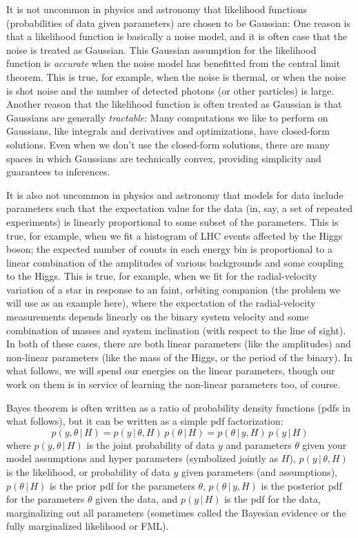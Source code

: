 \documentclass[12pt, letterpaper]{article}
\newcommand{\acronym}[1]{\small{#1}}
\newcommand{\FML}{\acronym{FML}}
\newcommand{\given}{\,|\,}
\begin{document}
It is not uncommon in physics and astronomy that likelihood functions
(probabilities of data given parameters) are chosen to be Gaussian:
One reason is that a likelihood function is basically a noise model,
and it is often case that the noise is treated as Gaussian.
This Gaussian assumption for the likelihood function is
\emph{accurate} when the noise model has benefitted from the central
limit theorem.
This is true, for example, when the noise is thermal, or when the
noise is shot noise and the number of detected photons (or other
particles) is large.
Another reason that the likelihood function is often treated as
Gaussian is that Gaussians are generally \emph{tractable}:
Many computations we like to perform on Gaussians, like integrals and
derivatives and optimizations, have closed-form solutions.
Even when we don't use the closed-form solutions, there are many
spaces in which Gaussians are technically convex, providing simplicity
and guarantees to inferences.

It is also not uncommon in physics and astronomy that models for data
include parameters such that the expectation value for the data (in,
say, a set of repeated experiments) is linearly proportional to some
subset of the parameters.
This is true, for example, when we fit a histogram of LHC events
affected by the Higgs boson; the expected number of counts in each
energy bin is proportional to a linear combination of the amplitudes
of various backgrounds and some coupling to the Higgs.
This is true, for example, when we fit for the radial-velocity
variation of a star in response to an faint, orbiting companion (the
problem we will use as an example here), where the expectation of the
radial-velocity measurements depends linearly on the binary system
velocity and some combination of masses and system inclination (with
respect to the line of sight).
In both of these cases, there are both linear parameters (like the
amplitudes) and non-linear parameters (like the mass of the Higgs, or
the period of the binary).
In what follows, we will spend our energies on the linear parameters,
though our work on them is in service of learning the non-linear
parameters too, of course.

Bayes theorem is often written as a ratio of probability density
functions (pdfs in what follows), but it can be written as a simple
pdf factorization:
\begin{equation}
p(y,\theta\given H) = p(y\given\theta,H)\,p(\theta\given H) = p(\theta\given y,H)\,p(y\given H)
\end{equation}
where
$p(y,\theta\given H)$ is the joint probability of data $y$ and
parameters $\theta$ given your model assumptions and hyper parameters
(symbolized jointly as $H$),
$p(y\given\theta,H)$ is the likelihood, or probability of data $y$
given parameters (and assumptions),
$p(\theta\given H)$ is the prior pdf for the parameters $\theta$,
$p(\theta\given y,H)$ is the posterior pdf for the parameters $\theta$
given the data,
and
$p(y\given H)$ is the pdf for the data, marginalizing out all
parameters (sometimes called the Bayesian evidence or the fully
marginalized likelihood or \FML).
\end{document}
